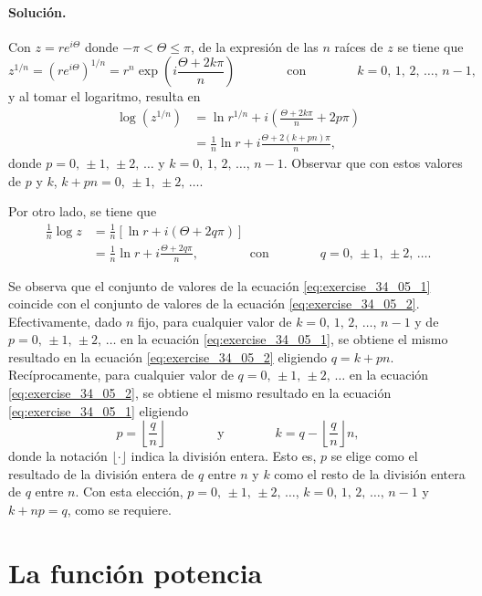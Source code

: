 \documentclass[a4paper]{report}
\begin{document}
\paragraph{Solución.} Con \(z=re^{i\Theta}\) donde \(-\pi<\Theta\leq\pi\), de la expresión de las \(n\) raíces de \(z\) se tiene que
\[
 z^{1/n}=\left(re^{i\Theta}\right)^{1/n}=r^n\exp\left(i\frac{\Theta+2k\pi}{n}\right)
 \qquad\qquad\textrm{con}\qquad\qquad
 k=0,\,1,\,2,\,\dots,\,n-1,
\]
y al tomar el logaritmo, resulta en
\begin{align}
 \log(z^{1/n})&=\ln r^{1/n}+i\left(\frac{\Theta+2k\pi}{n}+2p\pi\right)\nonumber\\
  &=\frac{1}{n}\ln r+i\frac{\Theta+2(k+pn)\pi}{n},\label{eq:exercise_34_05_1}
\end{align}
donde \(p=0,\,\pm1,\,\pm2,\,\dots\) y \(k=0,\,1,\,2,\,\dots,\,n-1\). Observar que con estos valores de \(p\) y \(k\), \(k+pn=0,\,\pm1,\,\pm2,\,\dots\).

Por otro lado, se tiene que 
\begin{align}
 \frac{1}{n}\log z&=\frac{1}{n}\left[\ln r+i(\Theta+2q\pi)\right]\nonumber\\
  &=\frac{1}{n}\ln r+i\frac{\Theta+2q\pi}{n},
  \qquad\qquad\textrm{con}\qquad\qquad
  q=0,\,\pm1,\,\pm2,\,\dots.\label{eq:exercise_34_05_2}
\end{align}

Se observa que el conjunto de valores de la ecuación \ref{eq:exercise_34_05_1} coincide con el conjunto de valores de la ecuación \ref{eq:exercise_34_05_2}. Efectivamente, dado \(n\) fijo, para cualquier valor de \(k=0,\,1,\,2,\,\dots,\,n-1\) y de \(p=0,\,\pm1,\,\pm2,\,\dots\) en la ecuación \ref{eq:exercise_34_05_1}, se obtiene el mismo resultado en la ecuación \ref{eq:exercise_34_05_2} eligiendo \(q=k+pn\). Recíprocamente, para cualquier valor de \(q=0,\,\pm1,\,\pm2,\,\dots\) en la ecuación \ref{eq:exercise_34_05_2}, se obtiene el mismo resultado en la ecuación \ref{eq:exercise_34_05_1} eligiendo 
\[
 p=\left\lfloor\frac{q}{n}\right\rfloor
 \qquad\qquad\textrm{y}\qquad\qquad
 k=q-\left\lfloor\frac{q}{n}\right\rfloor n,
\]
donde la notación \(\lfloor\cdot\rfloor\) indica la división entera. Esto es, \(p\) se elige como el resultado de la división entera de \(q\) entre \(n\) y \(k\) como el resto de la división entera de \(q\) entre \(n\). Con esta elección, \(p=0,\,\pm1,\,\pm2,\,\dots\), \(k=0,\,1,\,2,\,\dots,\,n-1\) y \(k+np=q\), como se requiere.

\section{La función potencia}\label{sec:power_function}
\end{document}
